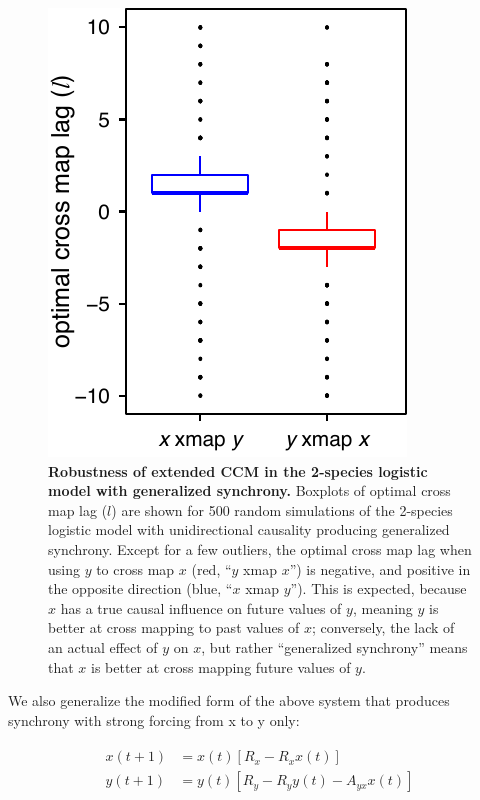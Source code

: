 \begin{figure}[!ht]
\begin{center}\includegraphics{fig_lag_2sp_synch_rand.pdf}\end{center}
\caption[Robustness of extended CCM in the 2-species logistic model with generalized synchrony.]{\textbf{Robustness of extended CCM in the 2-species logistic model with generalized synchrony.}\newline
Boxplots of optimal cross map lag ($l$) are shown for 500 random simulations of the 2-species logistic model with unidirectional causality producing generalized synchrony. Except for a few outliers, the optimal cross map lag when using $y$ to cross map $x$ (red, ``$y$ xmap $x$'') is negative, and positive in the opposite direction (blue, ``$x$ xmap $y$''). This is expected, because $x$ has a true causal influence on future values of $y$, meaning $y$ is better at cross mapping to past values of $x$; conversely, the lack of an actual effect of $y$ on $x$, but rather ``generalized synchrony'' means that $x$ is better at cross mapping future values of $y$.}
\label{fig_lag_2sp_synch_rand}
\end{figure}

We also generalize the modified form of the above system that produces synchrony with strong forcing from x to y only:

\begin{align}
\label{eqn_2sp_synch_rand}
\begin{split}
x(t+1) &= x(t) \left[R_x - R_x x(t)\right]\\
y(t+1) &= y(t) \left[R_y - R_y y(t) - A_{yx} x(t)\right]
\end{split}
\end{align}

